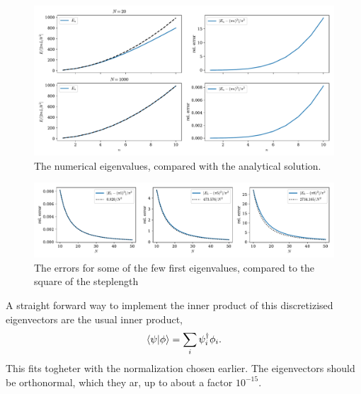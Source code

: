 \documentclass{article}
\begin{document}
    \begin{figure}[ht]
        \vspace{-1cm}
        \centering
        \includegraphics[width=\textwidth]{particle_in_box/values}
        \caption{The numerical eigenvalues, compared with the analytical solution.}
        \label{fig:eigenvalues}
    \end{figure}

    \begin{figure}[ht]
        \centering
        \includegraphics[width=\textwidth]{particle_in_box/error}
        \caption{The errors for some of the few first eigenvalues, compared to the square of the steplength}
        \label{fig:errors}
    \end{figure}

    A straight forward way to implement the inner product of this discretizised eigenvectors are the usual inner product, 
    \begin{equation*}
        \bra{\psi} \ket{\phi} = \sum_i \psi^\dagger_i \phi_i.
    \end{equation*}
    This fits togheter with the normalization chosen earlier. The eigenvectors should be orthonormal, which they ar, up to about a factor $10^{-15}$.
\end{document}
